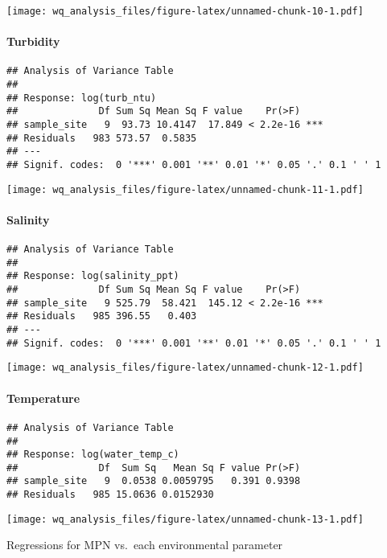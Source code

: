 \documentclass[
]{article}
\begin{document}
\texttt{[image: wq\_analysis\_files/figure-latex/unnamed-chunk-10-1.pdf]}

\hypertarget{turbidity}{%
\paragraph{Turbidity}\label{turbidity}}

\begin{verbatim}
## Analysis of Variance Table
## 
## Response: log(turb_ntu)
##              Df Sum Sq Mean Sq F value    Pr(>F)    
## sample_site   9  93.73 10.4147  17.849 < 2.2e-16 ***
## Residuals   983 573.57  0.5835                      
## ---
## Signif. codes:  0 '***' 0.001 '**' 0.01 '*' 0.05 '.' 0.1 ' ' 1
\end{verbatim}

\texttt{[image: wq\_analysis\_files/figure-latex/unnamed-chunk-11-1.pdf]}

\hypertarget{salinity}{%
\paragraph{Salinity}\label{salinity}}

\begin{verbatim}
## Analysis of Variance Table
## 
## Response: log(salinity_ppt)
##              Df Sum Sq Mean Sq F value    Pr(>F)    
## sample_site   9 525.79  58.421  145.12 < 2.2e-16 ***
## Residuals   985 396.55   0.403                      
## ---
## Signif. codes:  0 '***' 0.001 '**' 0.01 '*' 0.05 '.' 0.1 ' ' 1
\end{verbatim}

\texttt{[image: wq\_analysis\_files/figure-latex/unnamed-chunk-12-1.pdf]}

\hypertarget{temperature}{%
\paragraph{Temperature}\label{temperature}}

\begin{verbatim}
## Analysis of Variance Table
## 
## Response: log(water_temp_c)
##              Df  Sum Sq   Mean Sq F value Pr(>F)
## sample_site   9  0.0538 0.0059795   0.391 0.9398
## Residuals   985 15.0636 0.0152930
\end{verbatim}

\texttt{[image: wq\_analysis\_files/figure-latex/unnamed-chunk-13-1.pdf]}

Regressions for MPN vs.~each environmental parameter
\end{document}
